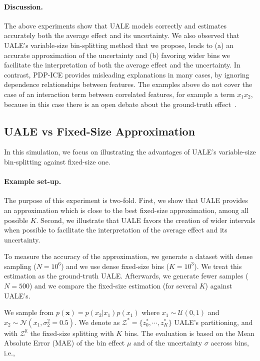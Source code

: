 \documentclass[twoside]{article}
\begin{document}
\paragraph{Discussion.}

The above experiments show that UALE models correctly and estimates accurately both the average effect and its uncertainty. We also observed that UALE's variable-size bin-splitting method that we propose, leads to (a) an accurate approximation of the uncertainty and (b) favoring wider bins we facilitate the interpretation of both the average effect and the uncertainty. In contrast, PDP-ICE provides misleading explanations in many cases, by ignoring dependence relationships between features. The examples above do not cover the case of an interaction term between correlated features, for example a term \(x_1x_2\), because in this case there is an open debate about the ground-truth effect~\citep{Gromping2020MAEP}.

\subsection{UALE vs Fixed-Size Approximation}
\label{sec:simulation-examples-2}

In this simulation, we focus on illustrating the advantages of UALE's
variable-size bin-splitting against fixed-size one.

\paragraph{Example set-up.}
The purpose of this experiment is two-fold. First, we show that UALE
provides an approximation which is close to the best fixed-size
approximation, among all possible \(K\). Second, we illustrate that
UALE favors the creation of wider intervals when possible to
facilitate the interpretation of the average effect and its
uncertainty.

To measure the accuracy of the approximation, we generate a dataset
with dense sampling (\(N=10^6\)) and we use dense fixed-size bins
(\(K=10^3\)). We treat this estimation as the ground-truth
UALE. Afterwards, we generate fewer samples (\(N=500\)) and we compare
the fixed-size estimation (for several \(K\)) against UALE's.

We sample from \(p(\mathbf{x}) = p(x_2|x_1)p(x_1)\) where
\(x_1 \sim \mathcal{U}(0,1)\) and
\(x_2 \sim \mathcal{N}(x_1, \sigma_2^2=0.5)\). We denote as
\(\mathcal{Z^*} = \{z^*_0, \cdots, z^*_K\}\) UALE's partitioning, and
with \(\mathcal{Z^{\mathtt{K}}}\) the fixed-size splitting with \(K\)
bins. The evaluation is based on the Mean Absolute Error (MAE) of the
bin effect \(\mu\) and of the uncertainty \(\sigma\) accross bins,
i.e.,
\end{document}
